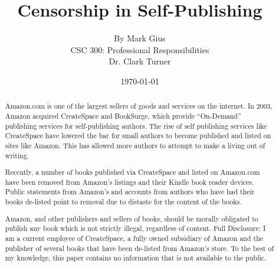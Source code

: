 \documentclass[11pt]{article}
\begin{document}
\title{\vfill Censorship in Self-Publishing} %
\author{
By Mark Gius\vspace{10pt} \\ 
CSC 300: Professional Responsibilities\vspace{10pt} \\ 
Dr. Clark Turner\vspace{10pt} \\ 
}
\date{\today}

\maketitle

\vfill  %
\begin{abstract}
Amazon.com is one of the largest sellers of goods and services on the internet.  In 2003, Amazon acquired CreateSpace and BookSurge, which provide ``On-Demand'' publishing services for self-publishing authors. The rise of self publishing services like CreateSpace have lowered the bar for small authors to become published and listed on sites like Amazon. This has allowed more authors to attempt to make a living out of writing.

Recently, a number of books published via CreateSpace and listed on Amazon.com have been removed from Amazon's listings and their Kindle book reader devices.  Public statements from Amazon's and accounts from authors who have had their books de-listed point to removal due to distaste for the content of the books. 

Amazon, and other publishers and sellers of books, should be morally obligated to publish any book which is not strictly illegal, regardless of content.
\vfill
Full Disclosure: I am a current employee of CreateSpace, a fully owned subsidiary of Amazon and the publisher of several books that have been de-listed from Amazon's store. To the best of my knowledge, this paper contains no information that is not available to the public.
\end{abstract}

\thispagestyle{empty} %
\newpage


\thispagestyle{empty}  %
\tableofcontents
\end{document}
